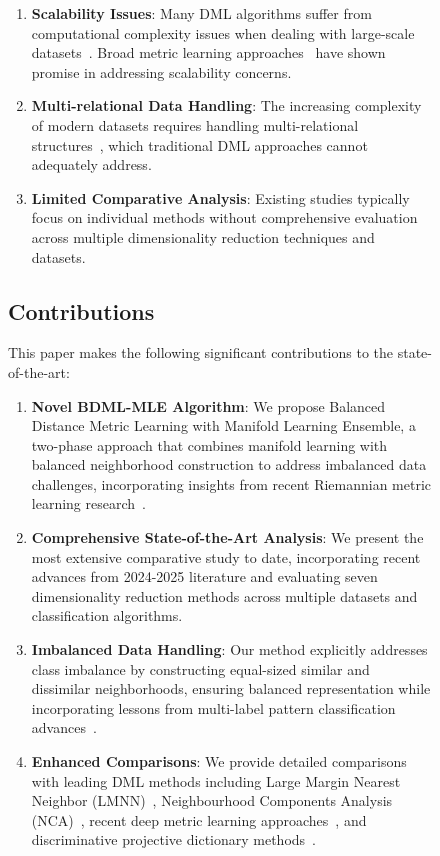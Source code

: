 \documentclass[review]{elsarticle}
\begin{document}
\begin{figure}[htbp]
\begin{enumerate}
\item \textbf{Scalability Issues}: Many DML algorithms suffer from computational complexity issues when dealing with large-scale datasets~\cite{weinberger2008fast}. Broad metric learning approaches~\cite{hu2025broad} have shown promise in addressing scalability concerns.

\item \textbf{Multi-relational Data Handling}: The increasing complexity of modern datasets requires handling multi-relational structures~\cite{pan2025metric}, which traditional DML approaches cannot adequately address.

\item \textbf{Limited Comparative Analysis}: Existing studies typically focus on individual methods without comprehensive evaluation across multiple dimensionality reduction techniques and datasets.
\end{enumerate}

\subsection{Contributions}

This paper makes the following significant contributions to the state-of-the-art:

\begin{enumerate}
\item \textbf{Novel BDML-MLE Algorithm}: We propose Balanced Distance Metric Learning with Manifold Learning Ensemble, a two-phase approach that combines manifold learning with balanced neighborhood construction to address imbalanced data challenges, incorporating insights from recent Riemannian metric learning research~\cite{gruffaz2025riemannian}.

\item \textbf{Comprehensive State-of-the-Art Analysis}: We present the most extensive comparative study to date, incorporating recent advances from 2024-2025 literature and evaluating seven dimensionality reduction methods across multiple datasets and classification algorithms.

\item \textbf{Imbalanced Data Handling}: Our method explicitly addresses class imbalance by constructing equal-sized similar and dissimilar neighborhoods, ensuring balanced representation while incorporating lessons from multi-label pattern classification advances~\cite{bs2025distance}.

\item \textbf{Enhanced Comparisons}: We provide detailed comparisons with leading DML methods including Large Margin Nearest Neighbor (LMNN)~\cite{weinberger2009distance}, Neighbourhood Components Analysis (NCA)~\cite{goldberger2005neighbourhood}, recent deep metric learning approaches~\cite{xu2025deep}, and discriminative projective dictionary methods~\cite{duan2025discriminative}.


\end{enumerate}
\end{figure}
\end{document}
